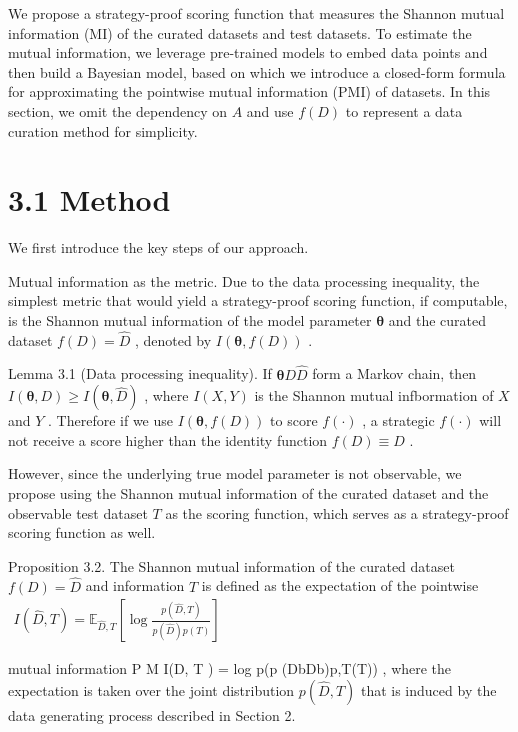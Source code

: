 We propose a strategy-proof scoring function that measures the Shannon
mutual information (MI) of the curated datasets and test datasets. To
estimate the mutual information, we leverage pre-trained models to embed
data points and then build a Bayesian model, based on which we introduce
a closed-form formula for approximating the pointwise mutual information
(PMI) of datasets. In this section, we omit the dependency on \(A\) and
use \(f ( D )\) to represent a data curation method for simplicity.

\section{3.1 Method}\label{method}

We first introduce the key steps of our approach.

Mutual information as the metric. Due to the data processing inequality,
the simplest metric that would yield a strategy-proof scoring function,
if computable, is the Shannon mutual information of the model parameter
\(\pmb \theta\) and the curated dataset \(f ( D ) = \widehat { D }\) ,
denoted by \(I ( \pmb \theta , f ( D ) )\) .

Lemma 3.1 (Data processing inequality). If
\(\pmb \theta  D  \widehat { D }\) form a Markov chain, then
\(I ( \pmb \theta , D ) \ge I ( \pmb \theta , \widehat D )\) , where
\(I ( X , Y )\) is the Shannon mutual infbormation of \(X\) and \(Y\) .
Therefore if we use \(I ( \pmb \theta , f ( D ) )\) to score
\(f ( \cdot )\) , a strategic \(f ( \cdot )\) will not receive a score
higher than the identity function \(f ( D ) \equiv D\) .

However, since the underlying true model parameter is not observable, we
propose using the Shannon mutual information of the curated dataset and
the observable test dataset \(T\) as the scoring function, which serves
as a strategy-proof scoring function as well.

Proposition 3.2. The Shannon mutual information of the curated dataset
\(f ( D ) = \widehat { D }\) and information \(T\) is defined as the
expectation of the pointwise
\(\begin{array} { r } { I ( \widehat { D } , T ) = \mathbb { E } _ { \widehat { D } , T } \left[ \log \frac { p ( \widehat { D } , T ) } { p ( \widehat { D } ) p ( T ) } \right] } \end{array}\)

mutual information P M I(D, T ) = log p(p (DbDb)p,T(T)) , where the
expectation is taken over the joint distribution
\(p ( \widehat { D } , T )\) that is induced by the data generating
process described in Section 2.

